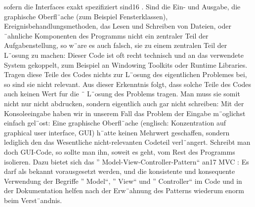 \documentclass[a4paper,10pt,ngerman]{scrartcl}
\begin{document}
    sofern die Interfaces exakt spezifiziert sind16
    .
    Sind die Ein- und Ausgabe, die graphische Oberfl¨ache (zum Beispiel Fensterklassen),
    Ereignisbehandlungsmethoden, das Lesen und Schreiben von Dateien, oder ¨ahnliche
    Komponenten des Programms nicht ein zentraler Teil der Aufgabenstellung, so w¨are
    es auch falsch, sie zu einem zentralen Teil der L¨osung zu machen: Dieser Code ist oft
    recht technisch und an das verwendete System gekoppelt, zum Beispiel an Windowing
    Toolkits oder Runtime Libraries. Tragen diese Teile des Codes nichts zur L¨osung des
    eigentlichen Problemes bei, so sind sie nicht relevant.
    Aus dieser Erkenntnis folgt, dass solche Teile des Codes auch keinen Wert fur die ¨
    L¨osung des Problems tragen. Man muss sie somit nicht nur nicht abdrucken, sondern
    eigentlich auch gar nicht schreiben: Mit der Konsoleeingabe haben wir in unserem Fall
    das Problem der Eingabe m¨oglichst einfach gel¨ost: Eine graphische Oberfl¨ache (englisch:
    Konzentration auf graphical user interface, GUI) h¨atte keinen Mehrwert geschaffen, sondern lediglich den
    das Wesentliche nicht-relevanten Codeteil verl¨angert.
    Schreibt man doch GUI-Code, so sollte man ihn, soweit es geht, vom Rest des Programms isolieren.
    Dazu bietet sich das ”
    Model-View-Controller-Pattern“ an17 MVC : Es darf
    als bekannt vorausgesetzt werden, und die konsistente und konsequente Verwendung der
    Begriffe ”
    Model“, ”
    View“ und ”
    Controller“ im Code und in der Dokumentation helfen
    nach der Erw¨ahnung des Patterns wiederum enorm beim Verst¨andnis.
\end{document}
